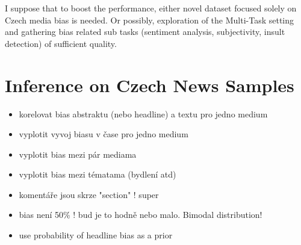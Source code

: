 I suppose that to boost the performance, either novel dataset focused solely on Czech media bias is needed. Or possibly, exploration of the Multi-Task setting and gathering bias related sub tasks (sentiment analysis, subjectivity, insult detection) of sufficient quality.


  

\section{Inference on Czech News Samples}

\begin{itemize}
    \item korelovat bias abstraktu (nebo headline) a textu pro jedno medium
    \item vyplotit vyvoj biasu v čase pro jedno medium
    \item vyplotit bias mezi pár mediama
    \item vyplotit bias mezi tématama (bydlení atd)
    \item komentáře jsou skrze "section" ! super
    \item bias není 50\% ! bud je to hodně nebo malo. Bimodal distribution!
    \item use probability of headline bias as a prior
\end{itemize}
